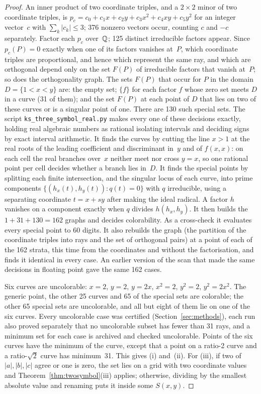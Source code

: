 \begin{proof}
An inner product of two coordinate triples, and a $2\times2$ minor of two coordinate triples, is
$p_c=c_0+c_1x+c_2y+c_3x^2+c_4xy+c_5y^2$ for an integer vector~$c$ with
$\sum_k|c_k|\le3$; 376 nonzero vectors occur, counting $c$ and $-c$ separately.  Factor each $p_c$ over~$\mathbb{Q}$;
125 distinct irreducible factors appear.  Since $p_c(P)=0$ exactly when one of its factors vanishes
at~$P$, which coordinate triples are proportional, and hence which represent the same ray, and which
are orthogonal depend only on the set $F(P)$ of irreducible factors that vanish at~$P$; so
does the orthogonality graph.  The sets $F(P)$ that occur for $P$ in the domain $D=\{1<x<y\}$ are:
the empty set; $\{f\}$ for each factor $f$ whose zero set meets $D$ in a curve (31 of them); and
the set $F(P)$ at each point of $D$ that lies on two of these curves or is a singular point of
one.  There are 130 such special sets.  The script \texttt{ks\_three\_symbol\_real.py} makes
every one of these decisions exactly, holding real algebraic numbers as rational isolating
intervals and deciding signs by exact interval arithmetic.  It finds the curves by cutting the
line $x>1$ at the real roots of the leading coefficient and discriminant in~$y$ and of
$f(x,x)$: on each cell the real branches over~$x$ neither meet nor cross $y=x$, so one rational
point per cell decides whether a branch lies in~$D$.  It finds the special points by splitting
each finite intersection, and the singular locus of each curve, into prime components
$\{(h_x(t),h_y(t)) : q(t)=0\}$ with $q$ irreducible, using a separating coordinate
$t=x+sy$ after making the ideal radical.  A factor $h$ vanishes on a component exactly
when $q$ divides $h(h_x,h_y)$.  It then builds the $1+31+130=162$ graphs and decides
colorability.  As a cross-check it evaluates every special point to 60 digits.  It also
rebuilds the graph (the partition of the coordinate triples into rays and the set of orthogonal pairs) at a
point of each of the 162 strata, this time from the coordinates and without the factorisation,
and finds it identical in every case.  An earlier version of the scan that made the same
decisions in floating point gave the same 162 cases.

Six curves are uncolorable: $x=2$, $y=2$, $y=2x$, $x^2=2$, $y^2=2$, $y^2=2x^2$.  The generic
point, the other 25 curves and 65 of the special sets are colorable; the other 65 special sets
are uncolorable, and all but eight of them lie on one of the six curves.  Every uncolorable case
was certified (Section~\ref{sec:methods}), each run also proved separately that no
uncolorable subset has fewer than 31 rays, and a minimum set for each case is archived and
checked uncolorable.  Points of the six curves have the minimum of the
curve, except that a point on a ratio-2 curve and a ratio-$\sqrt2$ curve has minimum~31.  This
gives (i) and~(ii).  For (iii), if two of $|a|,|b|,|c|$ agree or one is zero, the set lies on a
grid with two coordinate values and Theorem~\ref{thm:twosymbol}(iii) applies; otherwise, dividing by the smallest
absolute value and renaming puts it inside some $S(x,y)$.
\end{proof}

